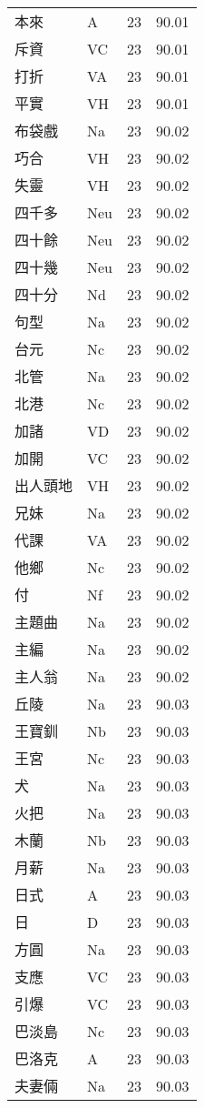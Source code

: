 \documentclass[twocolumn]{book}
\begin{document}
\begin{supertabular}{llrr}
本來 & A & 23 &  90.01\\
斥資 & VC & 23 &  90.01\\
打折 & VA & 23 &  90.01\\
平實 & VH & 23 &  90.01\\
布袋戲 & Na & 23 &  90.02\\
巧合 & VH & 23 &  90.02\\
失靈 & VH & 23 &  90.02\\
四千多 & Neu & 23 &  90.02\\
四十餘 & Neu & 23 &  90.02\\
四十幾 & Neu & 23 &  90.02\\
四十分 & Nd & 23 &  90.02\\
句型 & Na & 23 &  90.02\\
台元 & Nc & 23 &  90.02\\
北管 & Na & 23 &  90.02\\
北港 & Nc & 23 &  90.02\\
加諸 & VD & 23 &  90.02\\
加開 & VC & 23 &  90.02\\
出人頭地 & VH & 23 &  90.02\\
兄妹 & Na & 23 &  90.02\\
代課 & VA & 23 &  90.02\\
他鄉 & Nc & 23 &  90.02\\
付 & Nf & 23 &  90.02\\
主題曲 & Na & 23 &  90.02\\
主編 & Na & 23 &  90.02\\
主人翁 & Na & 23 &  90.02\\
丘陵 & Na & 23 &  90.03\\
王寶釧 & Nb & 23 &  90.03\\
王宮 & Nc & 23 &  90.03\\
犬 & Na & 23 &  90.03\\
火把 & Na & 23 &  90.03\\
木蘭 & Nb & 23 &  90.03\\
月薪 & Na & 23 &  90.03\\
日式 & A & 23 &  90.03\\
日 & D & 23 &  90.03\\
方圓 & Na & 23 &  90.03\\
支應 & VC & 23 &  90.03\\
引爆 & VC & 23 &  90.03\\
巴淡島 & Nc & 23 &  90.03\\
巴洛克 & A & 23 &  90.03\\
夫妻倆 & Na & 23 &  90.03\\

\end{supertabular}
\end{document}
